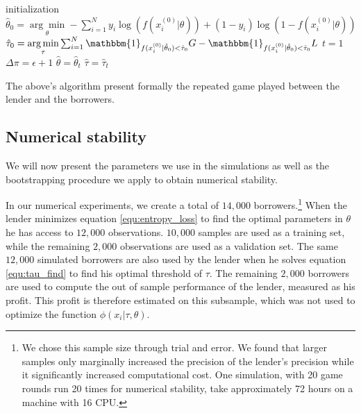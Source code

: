\documentclass[12pt]{article} %
\begin{document}
\begin{algorithm}[t!]
\SetAlgoLined{}
\KwResult{$\hat{\theta}$,  $\hat{\tau}$}
initialization\;
$\hat{\theta}_0 = \underset{\theta}{\arg \min } -\sum_{i=1}^N y_i \log(f(x_i^{(0)} | \theta)) + (1-y_i) \log(1-f(x_i^{(0)} | \theta))$ \;
$\hat{\tau}_0 = \underset{\tau}{\arg \min } \sum_{i=1}^N 
\mathbbm{1}_{f(x_i^{(0)} | \hat{\theta}_0)<\hat{\tau}_0} G -  \mathbbm{1}_{f(x_i^{(0)} | \hat{\theta}_0)<\hat{\tau}_0} L$ \;
$t=1$\;
$\Delta \pi= \epsilon+1$\;
$\hat{\theta} = \hat{\theta}_t$\;
$\hat{\tau} = \hat{\tau}_t$\;

\caption{The above's algorithm present formally the repeated game played between the lender and the borrowers.}
\label{algo:repeated_game}
\end{algorithm}

\subsection{Numerical stability}
We will now present the parameters we use in the simulations as well as the bootstrapping procedure we apply to obtain numerical stability. 

In our numerical experiments, we create a total of $14,000$ borrowers.\footnote{
We chose this sample size through trial and error. We found that larger samples only marginally increased the precision of the lender's precision while it significantly increased computational cost. One simulation, with 20 game rounds run 20 times for numerical stability, take approximately 72 hours on a machine with 16 CPU.
} When the lender minimizes equation \eqref{equ:entropy_loss} to find the optimal parameters in $\theta$ he has access to $12,000$ observations. $10,000$ samples are used as a training set, while the remaining $2,000$ observations are used as a validation set. The same $12,000$ simulated borrowers are also used by the lender when he solves equation \eqref{equ:tau_find} to find his optimal threshold of $\tau$. The remaining $2,000$ borrowers are used to compute the out of sample performance of the lender, measured as his profit. This profit is therefore estimated on this subsample, which was not used to optimize the function $\phi(x_i|\tau,\theta)$. 
\end{document}
